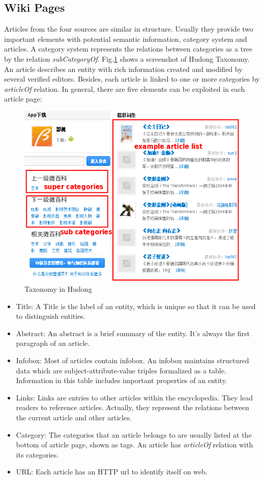 \documentclass[runningheads,a4paper]{llncs}
\begin{document}
\subsection{Wiki Pages}
Articles from the four sources are similar in structure. Usually they provide two important elements with potential semantic information, category system and articles. A category system represents the relations between categories as a tree by the relation \textit{subCategoryOf}. Fig.\ref{fig:hudong-taxonomy} shows a screenshot of Hudong Taxonomy. An article describes an entity with rich information created and modified by several verified editors. Besides, each article is linked to one or more categories by \textit{articleOf} relation. In general, there are five elements can be exploited in each article page:
\begin{figure}
    \centering
    \begin{minipage}[t]{0.8\textwidth}
        \centerline{\includegraphics[width=0.8\columnwidth]{fig/hudong-taxonomy2}}
        \caption{Taxonomy in Hudong}
        \label{fig:hudong-taxonomy}
    \end{minipage}%
\end{figure}
\begin{itemize}
  \item Title: A Title is the label of an entity, which is unique so that it can be used to distinguish entities.
  \item Abstract: An abstract is a brief summary of the entity. It's always the first paragraph of an article.
  \item Infobox: Most of articles contain infobox. An infobox maintains structured data which are subject-attribute-value triples formalized as a table. Information in this table includes important properties of an entity.
  \item Links: Links are entries to other articles within the encyclopedia. They lead readers to reference articles. Actually, they represent the relations between the current article and other articles.
  \item Category: The categories that an article belongs to are usually listed at the bottom of article page, shown as tags. An article has \textit{articleOf} relation with its categories.
  \item URL: Each article has an HTTP url to identify itself on web.
\end{itemize}
\end{document}

